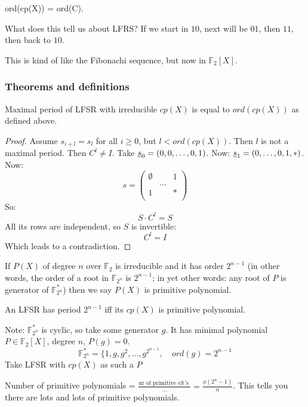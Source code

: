 \documentclass[language=english,number=]{homework}
\begin{document}
\begin{theorem}
ord(cp(X)) = ord(C).
\end{theorem}

What does this tell us about LFRS? If we start in $10$, next will be $01$, then $11$, then back to $10$.

This is kind of like the Fibonachi sequence, but now in $\mathbb{F}_2[X]$.

\subsubsection{Theorems and definitions}

\begin{theorem}
Maximal period of LFSR with irreducible $cp(X)$ is equal to $ord(cp(X))$ as defined above.
\end{theorem}
\begin{proof}
Assume $s_{i+l} = s_l$ for all $i \ge 0$, but $l < ord(cp(X))$.
Then $l$ is not a maximal period.
Then $C^l \ne I$.
Take $\underline{s}_0 = (0, 0, \dots, 0, 1)$.
Now: $\underline{s}_1 = (0, \dots, 0, 1, *)$.
Now:
\[
s = \begin{pmatrix}
\emptyset & & 1 \\
& \dots &  \\
1 & & *  \\
\end{pmatrix}
\]
So:
\[
S \cdot C^l = S
\]
All its rows are independent, so $S$ is invertible:
\[
C^l = I
\]
Which leads to a contradiction.
\end{proof}

\begin{definition}
If $P(X)$ of degree $n$ over $\mathbb{F}_2$ is irreducible and it has order $2^{n-1}$ (in other words, the order of a root in $\mathbb{F}_{2^n}$ is $2^{n-1}$; in yet other words: any root of $P$ is generator of $\mathbb{F}_{2^n}^*$) then we say $P(X)$ is primitive polynomial.
\end{definition}
\begin{definition}
An LFSR has period $2^{n-1}$ iff its $cp(X)$ is primitive polynomial.
\end{definition}

Note: $\mathbb{F}_{2^n}^*$ is cyclic, so take some generator $g$.
It has minimal polynomial $P \in \mathbb{F}_{2}[X]$, degree $n$, $P(g) = 0$.
\[
\mathbb{F}_{2^n}^* = \{1, g, g^2, \dots, g^{2^{n-1}}, \quad ord(g) = 2^{n-1}
\]
Take LFSR with $cp(X)$ as such a $P$

Number of primitive polynomials = $\frac{\text{nr of primitive elt's }}{...} = \frac
{\phi(2^n-1)}{n}$.
This tells you there are lots and lots of primitive polynomials.
\end{document}
